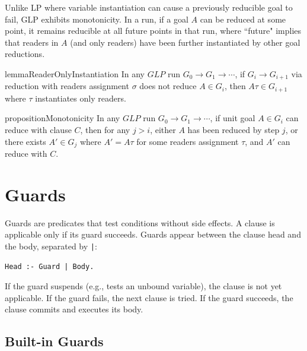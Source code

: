 Unlike LP where variable instantiation can cause a previously reducible goal to fail, GLP exhibits monotonicity. In a run, if a goal $A$ can be reduced at some point, it remains reducible at all future points in that run, where 
``future" implies that readers in $A$ (and only readers) have been further instantiated by other goal reductions.

\begin{restatable}{lemma}{ReaderOnlyInstantiation}\label{lemma:reader-only}
In any $GLP$ run $G_0 \rightarrow G_1 \rightarrow \cdots$, if $G_i \rightarrow G_{i+1}$ via reduction with readers assignment $\sigma$ does not reduce $A \in G_{i}$, then $A\tau \in G_{i+1}$ where $\tau$ instantiates only readers.
\end{restatable}

\begin{restatable}[Monotonicity]{proposition}{Monotonicity}\label{proposition:GLP-monotonicity}
In any $GLP$ run $G_0 \rightarrow G_1 \rightarrow \cdots$, if unit goal $A \in G_i$ can reduce with clause $C$, then for any $j > i$, either $A$ has been reduced by step $j$, or there exists $A' \in G_j$ where $A' = A\tau$ for some readers assignment $\tau$, and $A'$ can reduce with $C$.
\end{restatable}


\section{Guards}
\label{sec:guards}

Guards are predicates that test conditions without side effects. A clause is applicable only if its guard succeeds. Guards appear between the clause head and the body, separated by \verb$|$:

\begin{verbatim}
Head :- Guard | Body.
\end{verbatim}

If the guard suspends (e.g., tests an unbound variable), the clause is not yet applicable. If the guard fails, the next clause is tried. If the guard succeeds, the clause commits and executes its body.

\subsection{Built-in Guards}
\label{sec:builtin-guards}

